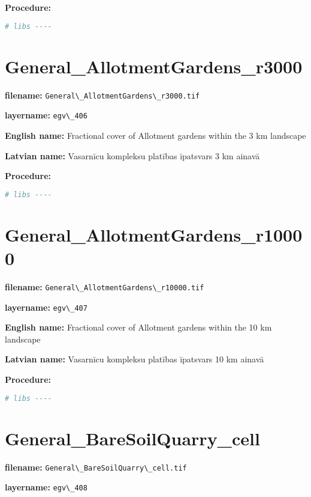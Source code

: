 \documentclass[
]{book}
\newcommand{\passthrough}[1]{#1}
\begin{document}
\textbf{Procedure:}

\begin{lstlisting}[language=R]
# libs ----
\end{lstlisting}

\section{General\_AllotmentGardens\_r3000}\label{ch06.406}

\textbf{filename:} \passthrough{\lstinline!General\_AllotmentGardens\_r3000.tif!}

\textbf{layername:} \passthrough{\lstinline!egv\_406!}

\textbf{English name:} Fractional cover of Allotment gardens within the 3 km landscape

\textbf{Latvian name:} Vasarnīcu kompleksu platības īpatsvars 3 km ainavā

\textbf{Procedure:}

\begin{lstlisting}[language=R]
# libs ----
\end{lstlisting}

\section{General\_AllotmentGardens\_r10000}\label{ch06.407}

\textbf{filename:} \passthrough{\lstinline!General\_AllotmentGardens\_r10000.tif!}

\textbf{layername:} \passthrough{\lstinline!egv\_407!}

\textbf{English name:} Fractional cover of Allotment gardens within the 10 km landscape

\textbf{Latvian name:} Vasarnīcu kompleksu platības īpatsvars 10 km ainavā

\textbf{Procedure:}

\begin{lstlisting}[language=R]
# libs ----
\end{lstlisting}

\section{General\_BareSoilQuarry\_cell}\label{ch06.408}

\textbf{filename:} \passthrough{\lstinline!General\_BareSoilQuarry\_cell.tif!}

\textbf{layername:} \passthrough{\lstinline!egv\_408!}
\end{document}
